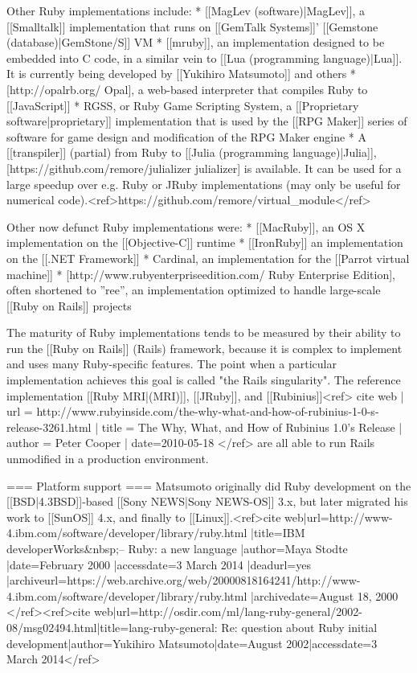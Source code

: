 Other Ruby implementations include:
* [[MagLev (software)|MagLev]], a [[Smalltalk]] implementation that runs on [[GemTalk Systems]]' [[Gemstone (database)|GemStone/S]] VM
* [[mruby]], an implementation designed to be embedded into C code, in a similar vein to [[Lua (programming language)|Lua]]. It is currently being developed by [[Yukihiro Matsumoto]] and others
* [http://opalrb.org/ Opal], a web-based interpreter that compiles Ruby to [[JavaScript]]
* RGSS, or Ruby Game Scripting System, a [[Proprietary software|proprietary]] implementation that is used by the [[RPG Maker]] series of software for game design and modification of the RPG Maker engine
* A [[transpiler]] (partial) from Ruby to [[Julia (programming language)|Julia]], [https://github.com/remore/julializer julializer] is available. It can be used for a large speedup over e.g. Ruby or JRuby implementations (may only be useful for numerical code).<ref>https://github.com/remore/virtual_module</ref>

Other now defunct Ruby implementations were:
* [[MacRuby]], an OS X implementation on the [[Objective-C]] runtime
* [[IronRuby]] an implementation on the [[.NET Framework]]
* Cardinal, an implementation for the [[Parrot virtual machine]]
* [http://www.rubyenterpriseedition.com/ Ruby Enterprise Edition], often shortened to ''ree'', an implementation optimized to handle large-scale [[Ruby on Rails]] projects

The maturity of Ruby implementations tends to be measured by their ability to run the [[Ruby on Rails]] (Rails) framework, because it is complex to implement and uses many Ruby-specific features. The point when a particular implementation achieves this goal is called "the Rails singularity". The reference implementation [[Ruby MRI|(MRI)]], [[JRuby]], and [[Rubinius]]<ref>
{{cite web
 | url = http://www.rubyinside.com/the-why-what-and-how-of-rubinius-1-0-s-release-3261.html
 | title = The Why, What, and How of Rubinius 1.0's Release
 | author = Peter Cooper
 | date=2010-05-18}}
</ref> are all able to run Rails unmodified in a production environment.

=== Platform support ===
Matsumoto originally did Ruby development on the [[BSD|4.3BSD]]-based [[Sony NEWS|Sony NEWS-OS]] 3.x, but later migrated his work to [[SunOS]] 4.x, and finally to [[Linux]].<ref>{{cite web|url=http://www-4.ibm.com/software/developer/library/ruby.html |title=IBM developerWorks&nbsp;– Ruby: a new language |author=Maya Stodte |date=February 2000 |accessdate=3 March 2014 |deadurl=yes |archiveurl=https://web.archive.org/web/20000818164241/http://www-4.ibm.com/software/developer/library/ruby.html |archivedate=August 18, 2000 }}</ref><ref>{{cite web|url=http://osdir.com/ml/lang-ruby-general/2002-08/msg02494.html|title=lang-ruby-general: Re: question about Ruby initial development|author=Yukihiro Matsumoto|date=August 2002|accessdate=3 March 2014}}</ref>

